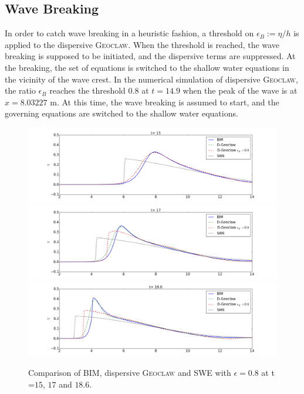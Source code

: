 \documentclass[review]{elsarticle}
\begin{document}
\subsection{Wave Breaking}

In order to catch wave breaking in a heuristic fashion,
a threshold on $\epsilon_B:=\eta/h$ is applied to the dispersive \textsc{Geoclaw}.
When the threshold is reached, 
the wave breaking is supposed to be initiated, 
and the dispersive terms are suppressed.
At the breaking, the set of equations is
switched to the shallow water equations
in the vicinity of the wave crest.
In the numerical simulation of dispersive \textsc{Geoclaw},
the ratio $\epsilon_B$ reaches the threshold $0.8$ at $t=14.9$
when the peak of the wave is at $x=8.03227$ m.
At this time, the wave breaking is assumed to start, 
and the governing equations are switched 
to the shallow water equations.

\begin{figure}[!htb]
\centering
\includegraphics[width=.9\textwidth]{_fig/bim_dgeo_etaB8_150.png}\\
\includegraphics[width=.9\textwidth]{_fig/bim_dgeo_etaB8_170.png}\\
\includegraphics[width=.9\textwidth]{_fig/bim_dgeo_etaB8_186.png}
\caption{Comparison of BIM, dispersive \textsc{Geoclaw} and SWE 
with $\epsilon=0.8$ at t =$15$, $17$ and $18.6$.}
\label{fig:dgeo_th08}
\end{figure}
\end{document}
